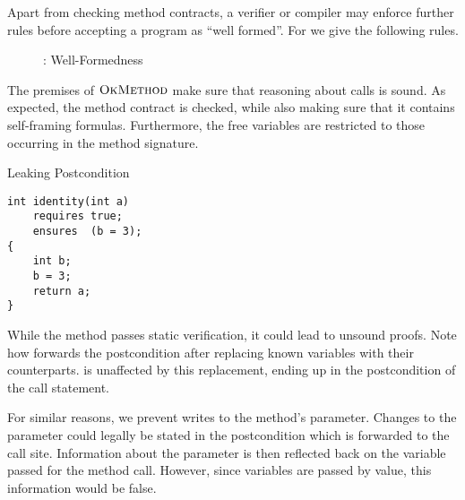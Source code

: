 Apart from checking method contracts, a verifier or compiler may enforce further rules before accepting a program as “well formed”.
For \svlidf we give the following rules.

\begin{figure}[h]
    
    \caption{\svlidf: Well-Formedness}
    \label{fig:idf-wf}
\end{figure}

The premises of $\textup{\textsc{OkMethod}}$ make sure that reasoning about calls is sound.
As expected, the method contract is checked, while also making sure that it contains self-framing formulas.
Furthermore, the free variables are restricted to those occurring in the method signature.

\begin{example}{Leaking Postcondition}
\begin{lstlisting}
int identity(int a)
    requires true;
    ensures  (b = 3);
{
    int b;
    b = 3;
    return a;
}
\end{lstlisting}
While the method passes static verification, it could lead to unsound proofs.
Note how  forwards the postcondition after replacing known variables with their counterparts.
 is unaffected by this replacement, ending up in the postcondition of the call statement.
\end{example}

For similar reasons, we prevent writes to the method's parameter.
Changes to the parameter could legally be stated in the postcondition which is forwarded to the call site.
Information about the parameter is then reflected back on the variable passed for the method call.
However, since variables are passed by value, this information would be false.